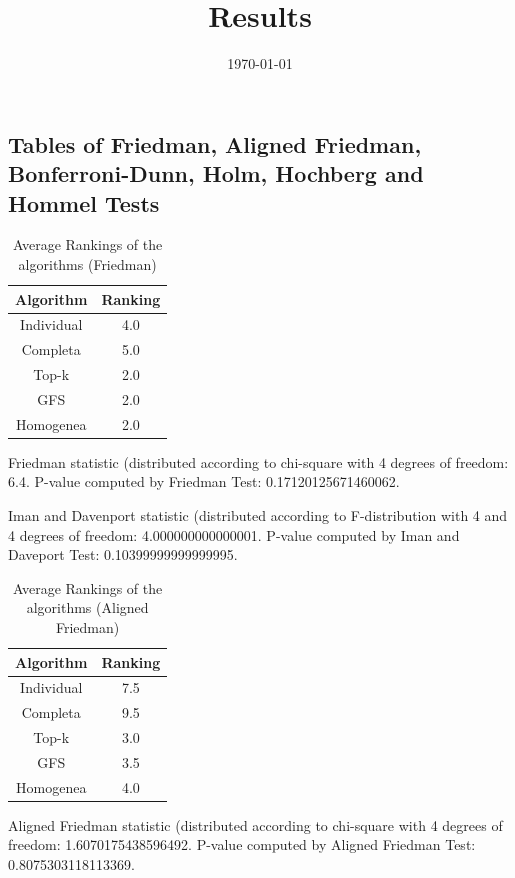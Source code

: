 \documentclass[a4paper,10pt]{article}
\title{Results}
\author{}
\date{\today}
\begin{document}
\begin{landscape}
\oddsidemargin 0in \topmargin 0in\maketitle
\section{Tables of Friedman, Aligned Friedman, Bonferroni-Dunn, Holm, Hochberg and Hommel Tests}
\begin{table}[!htp]
\centering
\caption{Average Rankings of the algorithms (Friedman)
}\begin{tabular}{c|c}
Algorithm&Ranking\\
\hline
Individual&4.0\\
Completa&5.0\\
Top-k&2.0\\
GFS&2.0\\
Homogenea&2.0\\
\end{tabular}
\end{table}


Friedman statistic (distributed according to chi-square with 4 degrees of freedom: 6.4. 
P-value computed by Friedman Test: 0.17120125671460062.\newline

Iman and Davenport statistic (distributed according to F-distribution with 4 and 4 degrees of freedom: 4.000000000000001. 
P-value computed by Iman and Daveport Test: 0.10399999999999995.\newline


\newpage

\begin{table}[!htp]
\centering
\caption{Average Rankings of the algorithms (Aligned Friedman)
}\begin{tabular}{c|c}
Algorithm&Ranking\\
\hline
Individual&7.5\\
Completa&9.5\\
Top-k&3.0\\
GFS&3.5\\
Homogenea&4.0\\
\end{tabular}
\end{table}


Aligned Friedman statistic (distributed according to chi-square with 4 degrees of freedom: 1.6070175438596492. 
P-value computed by Aligned Friedman Test: 0.8075303118113369.\newline



\end{landscape}
\end{document}
